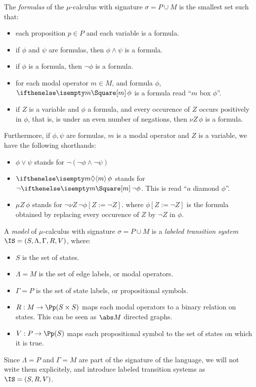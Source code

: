 \begin{definition}
    The \emph{formulas} of the $\mu$-calculus with signature $\sigma = P \cup M$
    is the smallest set such that:
    \begin{itemize}
        \item each proposition $p \in P$ and each variable is a formula.
        \item if $\phi$ and $\psi$ are formulas, then $\phi \wedge \psi$ is a formula.
        \item if $\phi$ is a formula, then $\neg \phi$ is a formula.
        \item for each modal operator $m \in M$, and formula $\phi$,
            $\boite{m} \phi$ is a formula read ``$m$ box $\phi$''.
        \item if $Z$ is a variable and $\phi$ a formula,
            and every occurence of $Z$ occurs positively in $\phi$,
            that is, is under an even number of negations,
            then $\nu Z\, \phi$ is a formula.
    \end{itemize}
    Furthermore, if $\phi, \psi$ are formulas, $m$ is a modal operator
    and $Z$ is a variable, we have the following shorthands:
    \begin{itemize}
        \item $\phi \vee \psi$ stands for $\neg (\neg \phi \wedge \neg \psi)$
        \item $\diam m \phi$ stands for $\neg \boite m \neg\phi$. This is read ``$a$ diamond $\phi$''.
        \item $\mu Z\, \phi$ stands for $\neg \nu Z\, \neg\phi[Z := \neg Z]$.
            where $\phi[Z := \neg Z]$ is the formula obtained by replacing
            every occurence of $Z$ by $\neg Z$ in $\phi$.
    \end{itemize}
\end{definition}


\begin{definition}
    A \emph{model} of $\mu$-calculus with signature $\sigma = P \cup M$
    is a \emph{labeled transition system}
    $\IS = (S, \Lambda, \Gamma, R, V)$, where:
    \begin{itemize}
        \item $S$ is the set of states.
        \item $\Lambda = M$ is the set of edge labels, or modal operators.
        \item $\Gamma = P$ is the set of state labels, or propositional symbols.
        \item $R: M \to \Pp(S \times S)$ maps each
            modal operators to a binary relation on states.
            This can be seen as $\abs M$ directed graphs.
        \item $V: P \to \Pp(S)$ maps each propositional symbol to
            the set of states on which it is true.
    \end{itemize}
    Since $\Lambda = P$ and $\Gamma = M$ are part of the signature of the
    language, we will not write them explicitely, and introduce
    labeled transition systems as $\IS = (S, R, V)$.
\end{definition}

